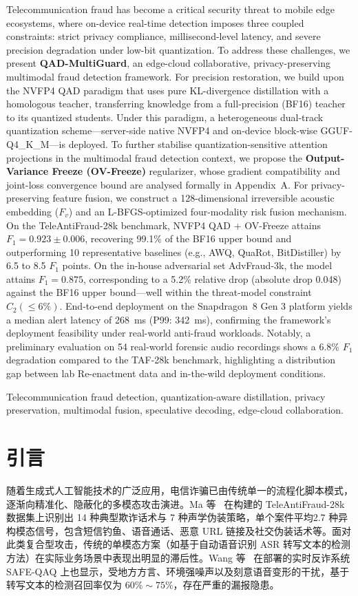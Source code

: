 \documentclass[11pt, a4paper]{article}
\begin{document}
\vspace{1em}
Telecommunication fraud has become a critical security threat to mobile edge ecosystems, where on-device real-time detection imposes three coupled constraints: strict privacy compliance, millisecond-level latency, and severe precision degradation under low-bit quantization. To address these challenges, we present \textbf{QAD-MultiGuard}, an edge-cloud collaborative, privacy-preserving multimodal fraud detection framework. For precision restoration, we build upon the NVFP4 QAD paradigm that uses pure KL-divergence distillation with a homologous teacher, transferring knowledge from a full-precision (BF16) teacher to its quantized students. Under this paradigm, a heterogeneous dual-track quantization scheme---server-side native NVFP4 and on-device block-wise GGUF-Q4\_K\_M---is deployed. To further stabilise quantization-sensitive attention projections in the multimodal fraud detection context, we propose the \textbf{Output-Variance Freeze (OV-Freeze)} regularizer, whose gradient compatibility and joint-loss convergence bound are analysed formally in Appendix~A. For privacy-preserving feature fusion, we construct a 128-dimensional irreversible acoustic embedding ($F_v$) and an L-BFGS-optimized four-modality risk fusion mechanism. On the TeleAntiFraud-28k benchmark, NVFP4 QAD + OV-Freeze attains $F_1 = 0.923\pm0.006$, recovering 99.1\% of the BF16 upper bound and outperforming 10 representative baselines (e.g., AWQ, QuaRot, BitDistiller) by 6.5 to 8.5 $F_1$ points. On the in-house adversarial set AdvFraud-3k, the model attains $F_1 = 0.875$, corresponding to a 5.2\% relative drop (absolute drop 0.048) against the BF16 upper bound---well within the threat-model constraint $C_2(\le 6\%)$. End-to-end deployment on the Snapdragon~8 Gen 3 platform yields a median alert latency of 268~ms (P99: 342~ms), confirming the framework's deployment feasibility under real-world anti-fraud workloads. Notably, a preliminary evaluation on 54 real-world forensic audio recordings shows a 6.8\% $F_1$ degradation compared to the TAF-28k benchmark, highlighting a distribution gap between lab Re-enactment data and in-the-wild deployment conditions.

Telecommunication fraud detection, quantization-aware distillation, privacy preservation, multimodal fusion, speculative decoding, edge-cloud collaboration.



\section{引言}
随着生成式人工智能技术的广泛应用，电信诈骗已由传统单一的流程化脚本模式，逐渐向精准化、隐蔽化的多模态攻击演进。Ma 等~\cite{1} 在构建的 TeleAntiFraud-28k 数据集上识别出 14 种典型欺诈话术与 7 种声学伪装策略，单个案件平均2.7 种异构模态信号，包含短信钓鱼、语音通话、恶意 URL 链接及社交伪装话术等。面对此类复合型攻击，传统的单模态方案（如基于自动语音识别 ASR 转写文本的检测方法）在实际业务场景中表现出明显的滞后性。Wang 等~\cite{2} 在部署的实时反诈系统 SAFE-QAQ 上也显示，受地方方言、环境强噪声以及刻意语音变形的干扰，基于转写文本的检测召回率仅为 $60\%\sim75\%$，存在严重的漏报隐患。
\end{document}
